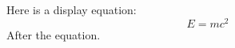 \documentclass{article}
\begin{document}
Here is a display equation:
$$ E = mc^2 $$ %
After the equation.
\end{document}
